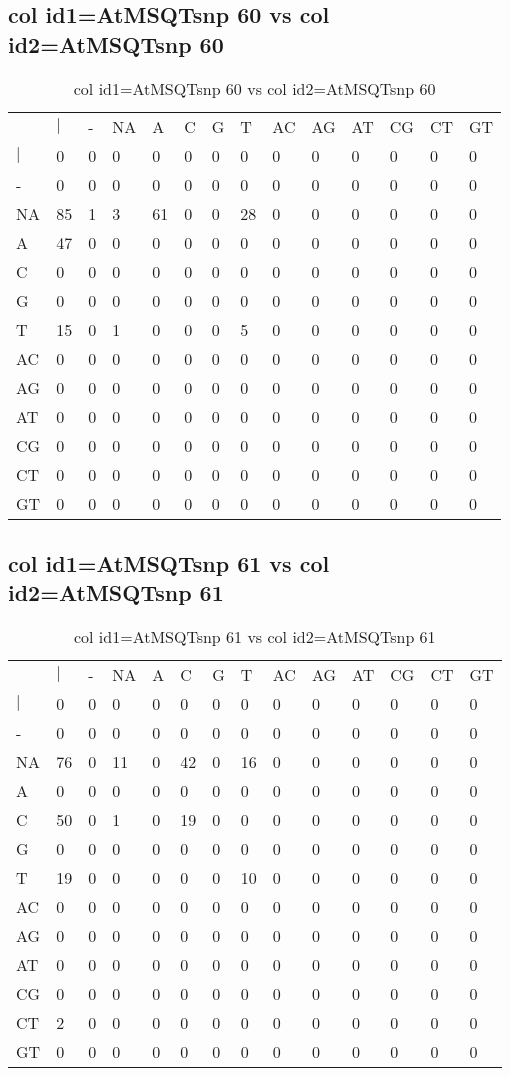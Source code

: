 \subsection{col id1=AtMSQTsnp 60 vs col id2=AtMSQTsnp 60}
\begin{center}
\begin{longtable}{|l|l|l|l|l|l|l|l|l|l|l|l|l|l|}
\caption{col id1=AtMSQTsnp 60 vs col id2=AtMSQTsnp 60} \label{table_dm756}\\
\hline
\\
\hline
&$|$&-&NA&A&C&G&T&AC&AG&AT&CG&CT&GT\\
$|$&0&0&0&0&0&0&0&0&0&0&0&0&0\\
-&0&0&0&0&0&0&0&0&0&0&0&0&0\\
NA&85&1&3&61&0&0&28&0&0&0&0&0&0\\
A&47&0&0&0&0&0&0&0&0&0&0&0&0\\
C&0&0&0&0&0&0&0&0&0&0&0&0&0\\
G&0&0&0&0&0&0&0&0&0&0&0&0&0\\
T&15&0&1&0&0&0&5&0&0&0&0&0&0\\
AC&0&0&0&0&0&0&0&0&0&0&0&0&0\\
AG&0&0&0&0&0&0&0&0&0&0&0&0&0\\
AT&0&0&0&0&0&0&0&0&0&0&0&0&0\\
CG&0&0&0&0&0&0&0&0&0&0&0&0&0\\
CT&0&0&0&0&0&0&0&0&0&0&0&0&0\\
GT&0&0&0&0&0&0&0&0&0&0&0&0&0\\
\hline
\end{longtable}
\end{center}

\subsection{col id1=AtMSQTsnp 61 vs col id2=AtMSQTsnp 61}
\begin{center}
\begin{longtable}{|l|l|l|l|l|l|l|l|l|l|l|l|l|l|}
\caption{col id1=AtMSQTsnp 61 vs col id2=AtMSQTsnp 61} \label{table_dm758}\\
\hline
\\
\hline
&$|$&-&NA&A&C&G&T&AC&AG&AT&CG&CT&GT\\
$|$&0&0&0&0&0&0&0&0&0&0&0&0&0\\
-&0&0&0&0&0&0&0&0&0&0&0&0&0\\
NA&76&0&11&0&42&0&16&0&0&0&0&0&0\\
A&0&0&0&0&0&0&0&0&0&0&0&0&0\\
C&50&0&1&0&19&0&0&0&0&0&0&0&0\\
G&0&0&0&0&0&0&0&0&0&0&0&0&0\\
T&19&0&0&0&0&0&10&0&0&0&0&0&0\\
AC&0&0&0&0&0&0&0&0&0&0&0&0&0\\
AG&0&0&0&0&0&0&0&0&0&0&0&0&0\\
AT&0&0&0&0&0&0&0&0&0&0&0&0&0\\
CG&0&0&0&0&0&0&0&0&0&0&0&0&0\\
CT&2&0&0&0&0&0&0&0&0&0&0&0&0\\
GT&0&0&0&0&0&0&0&0&0&0&0&0&0\\
\hline
\end{longtable}
\end{center}

